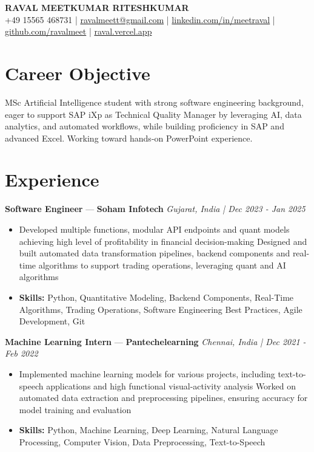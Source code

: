 \documentclass[a4paper,10pt]{article}
\begin{document}
\begin{center}
  {\Large\bfseries RAVAL MEETKUMAR RITESHKUMAR}\\[2pt]
  {\small +49 15565 468731 \;|\; \href{mailto:ravalmeett@gmail.com}{ravalmeett@gmail.com} \;|\; \href{https://www.linkedin.com/in/meetraval/}{linkedin.com/in/meetraval} \;|\; \href{https://github.com/ravalmeet}{github.com/ravalmeet} \;|\; \href{https://raval.vercel.app/}{raval.vercel.app}}
\end{center}
\vspace{-3pt}

\section*{Career Objective}
MSc Artificial Intelligence student with strong software engineering background, eager to support SAP iXp as Technical Quality Manager by leveraging AI, data analytics, and automated workflows, while building proficiency in SAP and advanced Excel. Working toward hands-on PowerPoint experience.\par

\section*{Experience}
\textbf{Software Engineer} — \textbf{Soham Infotech} \hfill \textit{Gujarat, India \;|\; Dec 2023 - Jan 2025}\par
\vspace{1pt}
\begin{itemize}
  \item Developed multiple functions, modular API endpoints and quant models achieving high level of profitability in financial decision-making Designed and built automated data transformation pipelines, backend components and real-time algorithms to support trading operations, leveraging quant and AI algorithms
  \item \textbf{Skills:} Python, Quantitative Modeling, Backend Components, Real-Time Algorithms, Trading Operations, Software Engineering Best Practices, Agile Development, Git
\end{itemize}
\vspace{3pt}
\textbf{Machine Learning Intern} — \textbf{Pantechelearning} \hfill \textit{Chennai, India \;|\; Dec 2021 - Feb 2022}\par
\vspace{1pt}
\begin{itemize}
  \item Implemented machine learning models for various projects, including text-to-speech applications and high functional visual-activity analysis Worked on automated data extraction and preprocessing pipelines, ensuring accuracy for model training and evaluation
  \item \textbf{Skills:} Python, Machine Learning, Deep Learning, Natural Language Processing, Computer Vision, Data Preprocessing, Text-to-Speech
\end{itemize}
\end{document}
